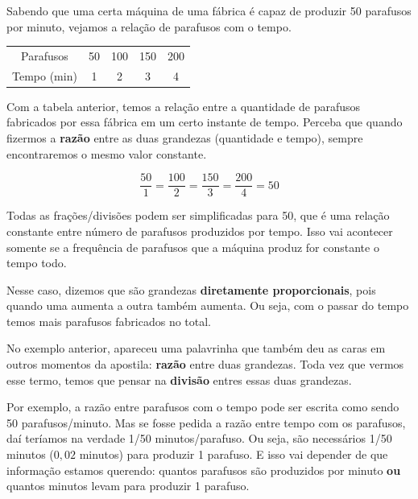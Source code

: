 \begin{exemplo}
    Sabendo que uma certa máquina de uma fábrica é capaz de produzir 50 parafusos por minuto, vejamos a relação de parafusos com o tempo.

    \begin{table}[H]
        \centering
        \begin{tabular}{ccccc}
            Parafusos & 50 & 100 & 150 & 200\\
            Tempo (min) & 1 & 2 & 3 & 4\\
        \end{tabular}
        \label{tab:fabrica_parafusos_1}
    \end{table}

    Com a tabela anterior, temos a relação entre a quantidade de parafusos fabricados por essa fábrica em um certo instante de tempo. Perceba que quando fizermos a \textbf{razão} entre as duas grandezas (quantidade e tempo), sempre encontraremos o mesmo valor constante. 

    \begin{equation}
        \frac{50}{1}=\frac{100}{2}=\frac{150}{3}=\frac{200}{4}=50
    \end{equation}

    Todas as frações/divisões podem ser simplificadas para 50, que é uma relação constante entre número de parafusos produzidos por tempo. Isso vai acontecer somente se a frequência de parafusos que a máquina produz for constante o tempo todo.

    Nesse caso, dizemos que são grandezas \textbf{diretamente proporcionais}, pois quando uma aumenta a outra também aumenta. Ou seja, com o passar do tempo temos mais parafusos fabricados no total.
\end{exemplo}

No exemplo anterior, apareceu uma palavrinha que também deu as caras em outros momentos da apostila: \textbf{razão} entre duas grandezas. Toda vez que vermos esse termo, temos que pensar na \textbf{divisão} entres essas duas grandezas. 

Por exemplo, a razão entre parafusos com o tempo pode ser escrita como sendo 50 parafusos/minuto. Mas se fosse pedida a razão entre tempo com os parafusos, daí teríamos na verdade 1/50 minutos/parafuso. Ou seja, são necessários 1/50 minutos (\(0,02\) minutos) para produzir 1 parafuso. E isso vai depender de que informação estamos querendo: quantos parafusos são produzidos por minuto \textbf{ou} quantos minutos levam para produzir 1 parafuso.

